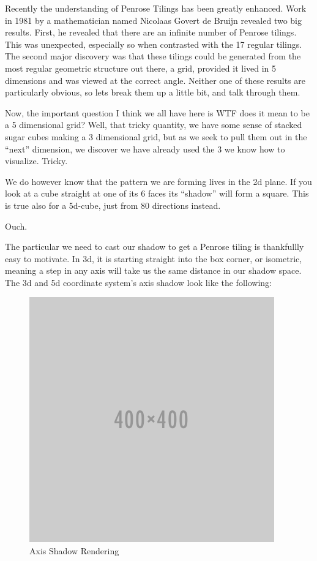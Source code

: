 \documentclass{amsart}
\begin{document}
Recently the understanding of Penrose Tilings has been greatly enhanced. Work in 1981 by a mathematician 
named Nicolaas Govert de Bruijn revealed two big results. First, he revealed that there are an infinite
number of Penrose tilings. This was unexpected, especially so when contrasted with the 17 regular tilings.
The second major discovery was that these tilings could be generated from the most regular geometric structure
out there, a grid, provided it lived in 5 dimensions and was viewed at the correct angle. Neither one of these
results are particularly obvious, so lets break them up a little bit, and talk through them.

Now, the important question I think we all have here is WTF does it mean to be a 5 dimensional grid? 
Well, that tricky quantity, we have some sense of stacked sugar cubes making a 3 dimensional grid, but as we seek 
to pull them out in the “next” dimension, we discover we have already used the 3 we know how to visualize. Tricky. 

We do however know that the pattern we are forming lives in the 2d plane. If you look at a cube straight at one 
of its 6 faces its ``shadow'' will form a square. This is true also for a 5d-cube, just from 80 directions instead. 

Ouch.

The particular we need to cast our shadow to get a Penrose tiling is thankfullly easy to motivate. In 3d,
it is starting straight into the box corner, or isometric, meaning a step in any axis will take us the same
distance in our shadow space. The 3d and 5d coordinate system’s axis shadow look like the following:

\begin{figure}[h]
  \centering
  \includegraphics[width=0.8\linewidth]{figures/placeholder}
  \caption{Axis Shadow Rendering}
  \label{fig:axis-shadow}
\end{figure}
\end{document}
